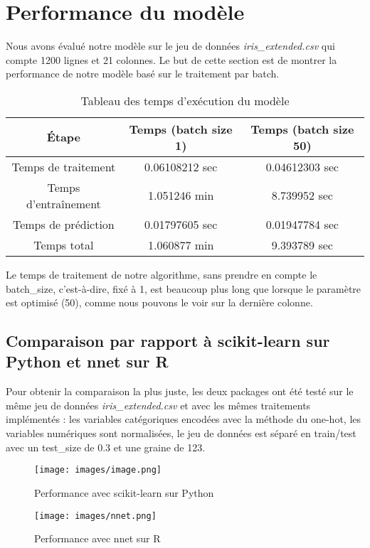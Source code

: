 \documentclass{rapport}
\begin{document}
\section{Performance du modèle}
Nous avons évalué notre modèle sur le jeu de données \textit{iris\_extended.csv} qui compte 1200 lignes et 21 colonnes.
Le but de cette section est de montrer la performance de notre modèle basé sur le traitement par batch.
\begin{table}[h!]
\centering
\begin{tabular}{|c|c|c|}
\hline
\textbf{Étape} & \textbf{Temps (batch size 1)} & \textbf{Temps (batch size 50)} \\
\hline
Temps de traitement & 0.06108212 sec & 0.04612303 sec \\
\hline
Temps d'entraînement & 1.051246 min & 8.739952 sec \\
\hline
Temps de prédiction & 0.01797605 sec & 0.01947784 sec \\
\hline
Temps total & 1.060877 min & 9.393789 sec \\
\hline
\end{tabular}
\caption{Tableau des temps d'exécution du modèle}
\end{table}

Le temps de traitement de notre algorithme, sans prendre en compte le batch\_size, c'est-à-dire, fixé à 1, est beaucoup plus long que lorsque le paramètre est optimisé (50), comme nous pouvons le voir sur la dernière colonne.

\subsection{Comparaison par rapport à scikit-learn sur Python et nnet sur R}

Pour obtenir la comparaison la plus juste, les deux packages ont été testé sur le même jeu de données \textit{iris\_extended.csv} et avec les mêmes traitements implémentés : les variables catégoriques encodées avec la méthode du one-hot, les variables numériques sont normalisées, le jeu de données est séparé en train/test avec un test\_size de 0.3 et une graine de 123.




\begin{figure}[h!]
    \centering
    \texttt{[image: images/image.png]}
    \caption{Performance avec scikit-learn sur Python}
    \label{fig:scikit-learn}
\end{figure}

\begin{figure}[h!]
    \centering
    \texttt{[image: images/nnet.png]}
    \caption{Performance avec nnet sur R}
    \label{fig:nnet_r}
\end{figure}
\end{document}
